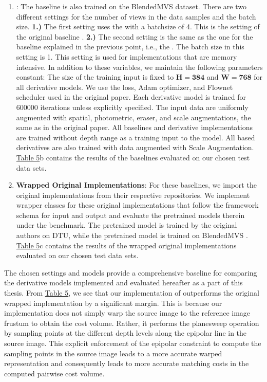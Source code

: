 \begin{enumerate}
    \item \textbf{\rmvd}: The {\rmvd} baseline is also trained on the BlendedMVS dataset. There are two different settings for the number of views in the data samples and the batch size. \textbf{1.)} The first setting uses the {\brs} with a batchsize of 4. This is the setting of the original {\rmvd} baseline \cite{schroeppel2022benchmark}. \textbf{2.)} The second setting is the same as the one for the {\mvsn} baseline explained in the previous point, i.e., the {\bms}. The batch size in this setting is 1. This setting is used for implementations that are memory intensive. In addition to these variables, we maintain the following parameters constant: The size of the training input is fixed to $\mathbf{H=384}$ and $\mathbf{W=768}$ for all {\rmvd} derivative models. We use the {\rmvd} loss\cite{schroeppel2022benchmark}, Adam optimizer, and Flownet scheduler \cite{dosovitskiy2015flownet} used in the original paper. Each {\rmvd} derivative model is trained for 600000 iterations unless explicitly specified. The input data are uniformly augmented with spatial, photometric, eraser, and scale augmentations, the same as in the original paper. All baselines and derivative implementations are trained without depth range as a training input to the model. All {\rmvd} based derivatives are also trained with data augmented with Scale Augmentation. \hyperref[tab:baseline]{Table 5}{b} contains the results of the {\rmvd} baselines evaluated on our chosen test data sets. 
    
    \item \textbf{Wrapped Original Implementations}: For these baselines, we import the original implementations from their respective repositories. We implement wrapper classes for these original implementations that follow the {\framework} framework schema for input and output and evaluate the pretrained models therein under the {\framework} benchmark. The pretrained {\mvsn} model is trained by the original authors on DTU\cite{Yao2018}, while the pretrained {\vmn} model is trained on BlendedMVS \cite{Zhang2020}. \hyperref[tab:baseline]{Table 5}{c} contains the results of the wrapped original implementations evaluated on our chosen test data sets.
\end{enumerate}

The chosen settings and models provide a comprehensive baseline for comparing the derivative models implemented and evaluated hereafter as a part of this thesis. From \hyperref[tab:baseline]{Table 5}, we see that our implementation of {\mvsn} outperforms the original wrapped implementation by a significant margin. This is because our implementation does not simply warp the source image to the reference image frustum to obtain the cost volume. Rather, it performs the planesweep operation by sampling points at the different depth levels along the epipolar line in the source image. This explicit enforcement of the epipolar constraint to compute the sampling points in the source image leads to a more accurate warped representation and consequently leads to more accurate matching costs in the computed pairwise cost volume. 




